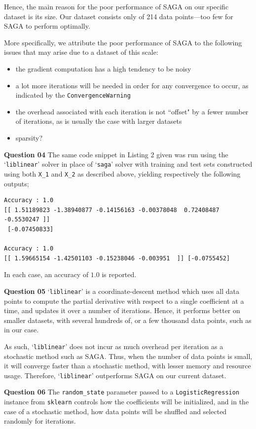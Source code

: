 \documentclass{article}[a4paper]
\begin{document}
	Hence, the main reason for the poor performance of SAGA on our specific dataset is its size. Our dataset consists only of 214 data points---too few for SAGA to perform optimally.
	
	More specifically, we attribute the poor performance of SAGA to the following issues that may arise due to a dataset of this scale:
	\begin{itemize}[noitemsep]
		\item the gradient computation has a high tendency to be noisy
		\item a lot more iterations will be needed in order for any convergence to occur, as indicated by the \texttt{ConvergenceWarning}\item the overhead associated with each iteration is not ``offset" by a fewer number of iterations, as is usually the case with larger datasets
		\item sparsity?
	\end{itemize}
	\medskip
	
	\textbf{Question 04} The same code snippet in Listing 2 given was run using the `\texttt{liblinear}' solver in place of `\texttt{saga}' solver with training and test sets constructed using both \texttt{X\_1} and \texttt{X\_2} as described above, yielding respectively the following outputs;
	\begin{verbatim}
Accuracy : 1.0
[[ 1.51189823 -1.38940877 -0.14156163 -0.00378048  0.72408487 -0.5530247 ]]
 [-0.07450833]

Accuracy : 1.0
[[ 1.59665154 -1.42501103 -0.15238046 -0.003951  ]] [-0.0755452]
\end{verbatim}
	In each case, an accuracy of $1.0$ is reported.
	\medskip

	\textbf{Question 05} `\texttt{liblinear}' is a coordinate-descent method which uses all data points to compute the partial derivative with respect to a single coefficient at a time, and updates it over a number of iterations. Hence, it performs better on smaller datasets, with several hundreds of, or a few thousand data points, such as in our case.

	As such, `\texttt{liblinear}' does not incur as much overhead per iteration as a stochastic method such as SAGA. Thus, when the number of data points is small, it will converge faster than a stochastic method, with lesser memory and resource usage. Therefore, `\texttt{liblinear}' outperforms SAGA on our current dataset.
	\medskip

	\textbf{Question 06} The \texttt{random\_state} parameter passed to a \texttt{LogisticRegression} instance from \texttt{sklearn} controls how the coefficients will be initialized, and in the case of a stochastic method, how data points will be shuffled and selected randomly for iterations.
\end{document}
